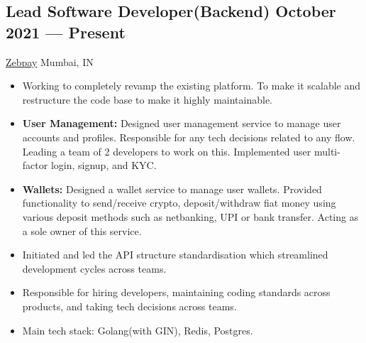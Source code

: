 \documentclass[a4,10pt]{article}
\newcommand{\subtext}[1]{
#1\par\vspace{-0.2cm}}
\newenvironment{zitemize}{
\begin{itemize}\itemsep0pt \parskip0pt \parsep1pt}
{\end{itemize}\vspace{-0.5cm}}
\begin{document}
\subsection*{Lead Software Developer(Backend) \hfill October 2021 --- Present} 
\subtext{\href{https://zebpay.com/in/}{Zebpay} \hfill Mumbai, IN} 
    \begin{zitemize}
        \item Working to completely revamp the existing platform. To make it scalable and restructure the code base to make it highly maintainable.
        \item {\bf User Management: } Designed user management service to manage user accounts and profiles. Responsible for any tech decisions related to any flow. Leading a team of 2 developers to work on this. Implemented user multi-factor login, signup, and KYC. 
        \item {\bf Wallets: } Designed a wallet service to manage user wallets. Provided functionality to send/receive crypto, deposit/withdraw fiat money using various deposit methods such as netbanking, UPI or bank transfer. Acting as a sole owner of this service. 
        \item Initiated and led the API structure standardisation which streamlined development cycles across teams.
        \item Responsible for hiring developers, maintaining coding standards across products, and taking tech decisions across teams.
        \item Main tech stack: Golang(with GIN), Redis, Postgres.
    \end{zitemize}
\end{document}
